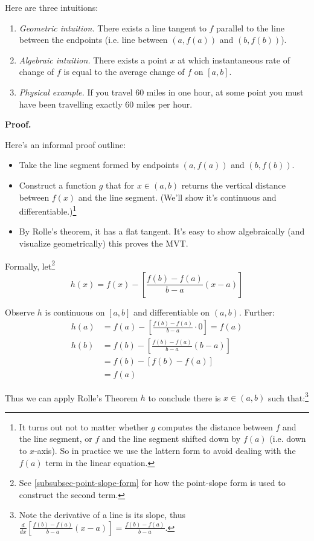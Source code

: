 Here are three intuitions:
\begin{enumerate}
\item \textit{Geometric intuition.} There exists a line tangent to $f$
  parallel to the line between the endpoints (i.e. line between
  $(a, f(a))$ and $(b, f(b))$).
\item \textit{Algebraic intuition.} There exists a point $x$ at which
  instantaneous rate of change of $f$ is equal to the average change
  of $f$ on $[a,b]$.
\item \textit{Physical example.} If you travel 60 miles in one hour,
  at some point you must have been travelling exactly 60 miles per
  hour.
\end{enumerate}

\textbf{Proof.}

Here's an informal proof outline:
\begin{itemize}
\item Take the line segment formed by endpoints $(a,f(a))$ and
  $(b,f(b))$.
\item Construct a function $g$ that for $x\in(a,b)$ returns the vertical
  distance between $f(x)$ and the line segment. (We'll show it's
  continuous and differentiable.)\footnote{It turns out not to matter
    whether $g$ computes the distance between $f$ and the line
    segment, or $f$ and the line segment shifted down by $f(a)$ (i.e.
    down to $x$-axis). So in practice we use the lattern form to avoid
    dealing with the $f(a)$ term in the linear equation.}
\item By Rolle's theorem, it has a flat tangent. It's easy to show
  algebraically (and visualize geometrically) this proves the MVT.
\end{itemize}

Formally, let\footnote{See \ref{subsubsec-point-slope-form} for how
  the point-slope form is used to construct the second term.}
\[h(x)=f(x)-\left[\frac{f(b)-f(a)}{b-a}(x-a)\right]\]

Observe $h$ is continuous on $[a,b]$ and differentiable on $(a,b)$.
Further:
\begin{align*}
  h(a)&=f(a)-\left[\frac{f(b)-f(a)}{b-a}\cdot0\right]=f(a)\\
  h(b)&=f(b)-\left[\frac{f(b)-f(a)}{b-a}(b-a)\right]\\
      &=f(b)-[f(b)-f(a)]\\
      &=f(a)
\end{align*}

Thus we can apply Rolle's Theorem $h$ to conclude there is $x\in(a,b)$
such that:\footnote{Note the derivative of a line is its slope, thus
  $\frac{d}{dx}\left[\frac{f(b)-f(a)}{b-a}(x-a)\right]=\frac{f(b)-f(a)}{b-a}$.}

